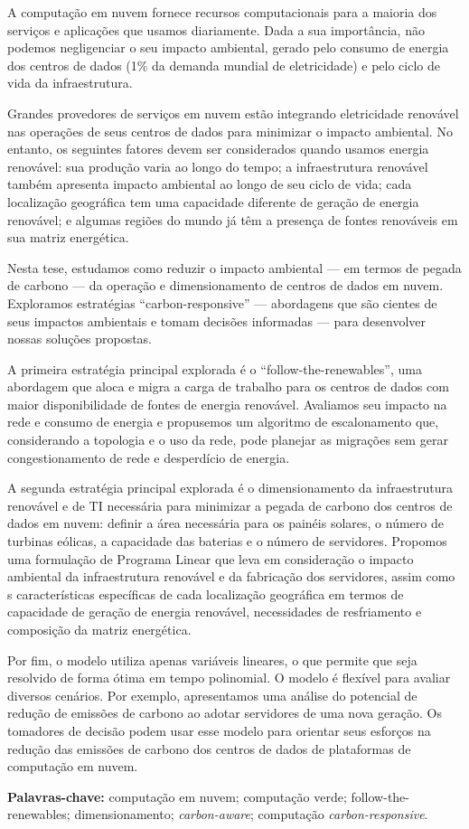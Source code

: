 
A computação em nuvem fornece recursos computacionais para a maioria dos serviços e aplicações que usamos diariamente. Dada a sua importância, não podemos negligenciar o seu impacto ambiental, gerado pelo consumo de energia dos centros de dados (1\% da demanda mundial de eletricidade) e pelo ciclo de vida da infraestrutura.


Grandes provedores de serviços em nuvem estão integrando eletricidade renovável nas operações de seus centros de dados para minimizar o impacto ambiental. No entanto, os seguintes fatores devem ser considerados quando usamos energia renovável: sua produção varia ao longo do tempo; a infraestrutura renovável também apresenta impacto ambiental ao longo de seu ciclo de vida; cada localização geográfica tem uma capacidade diferente de geração de energia renovável; e algumas regiões do mundo já têm a presença de fontes renováveis em sua matriz energética.


Nesta tese, estudamos como reduzir o impacto ambiental --- em termos de pegada de carbono --- da operação e dimensionamento de centros de dados em nuvem. Exploramos estratégias ``carbon-responsive'' --- abordagens que são cientes de seus impactos ambientais e tomam decisões informadas --- para desenvolver nossas soluções propostas.

A primeira estratégia principal explorada é o ``follow-the-renewables'', uma abordagem que aloca e migra a carga de trabalho para os centros de dados com maior disponibilidade de fontes de energia renovável. Avaliamos seu impacto na rede e consumo de energia e propusemos um algoritmo de escalonamento que, considerando a topologia  e o uso da rede, pode planejar as migrações sem gerar congestionamento de rede e desperdício de energia.

A segunda estratégia principal explorada é o dimensionamento da infraestrutura renovável e de TI necessária para minimizar a pegada de carbono dos centros de dados em nuvem: definir a área necessária para os painéis solares, o número de turbinas eólicas, a capacidade das baterias e o número de servidores. Propomos uma formulação de Programa Linear que leva em consideração o impacto ambiental da infraestrutura renovável e da fabricação dos servidores, assim como s características específicas de cada localização geográfica em termos de capacidade de geração de energia renovável, necessidades de resfriamento e composição da matriz energética. 

Por fim, o modelo utiliza apenas variáveis lineares, o que permite que seja resolvido de forma ótima em tempo polinomial. O modelo é flexível para avaliar diversos cenários. Por exemplo, apresentamos uma análise do potencial de redução de emissões de carbono ao adotar servidores de uma nova geração. Os tomadores de decisão podem usar esse modelo para orientar seus esforços na redução das emissões de carbono dos centros de dados de plataformas de computação em nuvem.




\textbf{Palavras-chave:} computação em nuvem; computação verde; follow-the-renewables; dimensionamento; \textit{carbon-aware}; computação \textit{carbon-responsive}. 